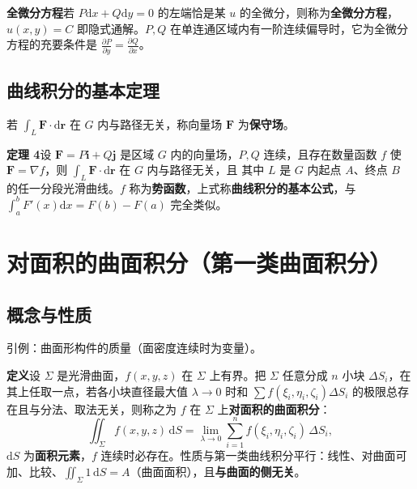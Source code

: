 \textbf{全微分方程}\quad 若 $P\mathrm{d}x+Q\mathrm{d}y=0$ 的左端恰是某 $u$ 的全微分，则称为\textbf{全微分方程}，$u(x,y)=C$ 即隐式通解。$P,Q$ 在单连通区域内有一阶连续偏导时，它为全微分方程的充要条件是 $\frac{\partial P}{\partial y}=\frac{\partial Q}{\partial x}$。


\subsection{曲线积分的基本定理}

若 $\int_L\boldsymbol F\cdot\mathrm{d}\boldsymbol r$ 在 $G$ 内与路径无关，称向量场 $\boldsymbol F$ 为\textbf{保守场}。

\textbf{定理 4}\quad 设 $\boldsymbol F=P\boldsymbol i+Q\boldsymbol j$ 是区域 $G$ 内的向量场，$P,Q$ 连续，且存在数量函数 $f$ 使 $\boldsymbol F=\nabla f$，则 $\int_L\boldsymbol F\cdot\mathrm{d}\boldsymbol r$ 在 $G$ 内与路径无关，且
其中 $L$ 是 $G$ 内起点 $A$、终点 $B$ 的任一分段光滑曲线。$f$ 称为\textbf{势函数}，上式称\textbf{曲线积分的基本公式}，与 $\int_a^bF'(x)\mathrm{d}x=F(b)-F(a)$ 完全类似。


\section{对面积的曲面积分（第一类曲面积分）}
\subsection{概念与性质}

引例：曲面形构件的质量（面密度连续时为变量）。

\textbf{定义}\quad 设 $\Sigma$ 是光滑曲面，$f(x,y,z)$ 在 $\Sigma$ 上有界。把 $\Sigma$ 任意分成 $n$ 小块 $\Delta S_i$，在其上任取一点，若各小块直径最大值 $\lambda\to0$ 时和 $\sum f(\xi_i,\eta_i,\zeta_i)\Delta S_i$ 的极限总存在且与分法、取法无关，则称之为 $f$ 在 $\Sigma$ 上\textbf{对面积的曲面积分}：
\[
\iint_\Sigma f(x,y,z)\,\mathrm{d}S=\lim_{\lambda\to0}\sum_{i=1}^{n}f(\xi_i,\eta_i,\zeta_i)\,\Delta S_i ,
\]
$\mathrm{d}S$ 为\textbf{面积元素}，$f$ 连续时必存在。性质与第一类曲线积分平行：线性、对曲面可加、比较、$\iint_\Sigma1\,\mathrm{d}S=A$（曲面面积），且\textbf{与曲面的侧无关}。

